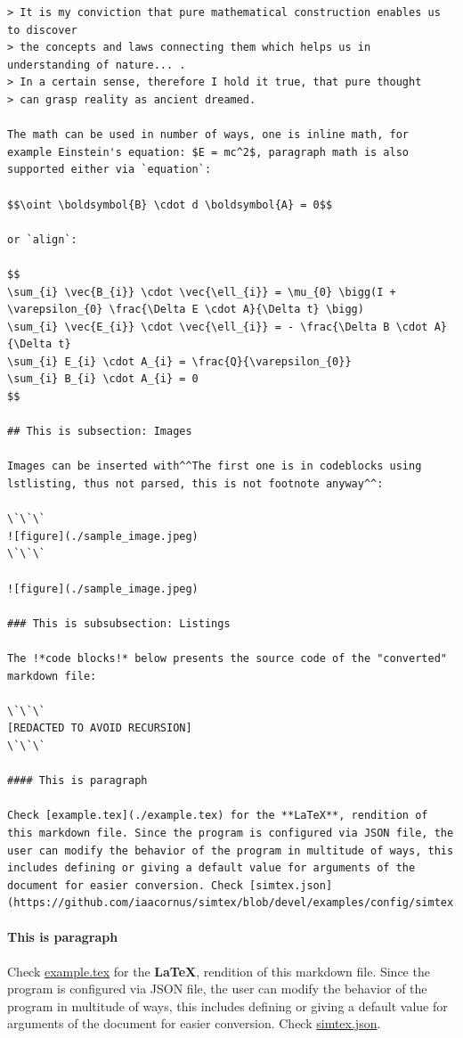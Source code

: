 \documentclass[12pt, UTF8]{article}
\begin{document}
\begin{lstlisting}
> It is my conviction that pure mathematical construction enables us to discover
> the concepts and laws connecting them which helps us in understanding of nature... .
> In a certain sense, therefore I hold it true, that pure thought
> can grasp reality as ancient dreamed.

The math can be used in number of ways, one is inline math, for example Einstein's equation: $E = mc^2$, paragraph math is also supported either via `equation`:

$$\oint \boldsymbol{B} \cdot d \boldsymbol{A} = 0$$

or `align`:

$$
\sum_{i} \vec{B_{i}} \cdot \vec{\ell_{i}} = \mu_{0} \bigg(I + \varepsilon_{0} \frac{\Delta E \cdot A}{\Delta t} \bigg)
\sum_{i} \vec{E_{i}} \cdot \vec{\ell_{i}} = - \frac{\Delta B \cdot A}{\Delta t}
\sum_{i} E_{i} \cdot A_{i} = \frac{Q}{\varepsilon_{0}}
\sum_{i} B_{i} \cdot A_{i} = 0
$$

## This is subsection: Images

Images can be inserted with^^The first one is in codeblocks using lstlisting, thus not parsed, this is not footnote anyway^^:

\`\`\`
![figure](./sample_image.jpeg)
\`\`\`

![figure](./sample_image.jpeg)

### This is subsubsection: Listings

The !*code blocks!* below presents the source code of the "converted" markdown file:

\`\`\`
[REDACTED TO AVOID RECURSION]
\`\`\`

#### This is paragraph

Check [example.tex](./example.tex) for the **LaTeX**, rendition of this markdown file. Since the program is configured via JSON file, the user can modify the behavior of the program in multitude of ways, this includes defining or giving a default value for arguments of the document for easier conversion. Check [simtex.json](https://github.com/iaacornus/simtex/blob/devel/examples/config/simtex.json).

\end{lstlisting}
	
	\paragraph{This is paragraph}
	
	Check \href{./example.tex}{example.tex} for the \textbf{LaTeX}, rendition of this markdown file. Since the program is configured via JSON file, the user can modify the behavior of the program in multitude of ways, this includes defining or giving a default value for arguments of the document for easier conversion. Check \href{https://github.com/iaacornus/simtex/blob/devel/examples/config/simtex.json}{simtex.json}.
\end{document}
